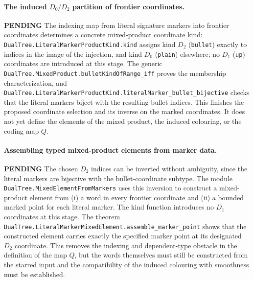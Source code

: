 \documentclass[11pt]{article}
\newcommand{\todo}{\textcolor{gray!70!black}{\textbf{PENDING}}}
\newcommand{\lean}[1]{\texttt{#1}}
\begin{document}
\paragraph{The induced $D_0/D_2$ partition of frontier coordinates.} \todo
The indexing map from literal signature markers into frontier coordinates
determines a concrete mixed-product coordinate kind:
\lean{DualTree.LiteralMarkerProductKind.kind} assigns kind $D_2$
(\texttt{bullet}) exactly to indices in the image of the injection,
and kind $D_0$ (\texttt{plain}) elsewhere; no $D_1$
(\texttt{up}) coordinates are introduced at this stage.
The generic
\lean{DualTree.MixedProduct.bulletKindOfRange_iff} proves the
membership characterization, and
\lean{DualTree.LiteralMarkerProductKind.literalMarker_bullet_bijective}
checks that the literal markers biject with the resulting bullet indices.
This finishes the proposed coordinate selection and its inverse
on the marked coordinates. It does not yet define the elements of the
mixed product, the induced colouring, or the coding map $Q$.

\paragraph{Assembling typed mixed-product elements from marker data.} \todo
The chosen $D_2$ indices can be inverted without ambiguity, since
the literal markers are bijective with the bullet-coordinate subtype.
The module \lean{DualTree.MixedElementFromMarkers} uses this inversion
to construct a mixed-product element from (i) a word in every frontier
coordinate and (ii) a bounded marked point for each literal marker.
The kind function introduces no $D_1$ coordinates at this stage.
The theorem
\lean{DualTree.LiteralMarkerMixedElement.assemble_marker_point}
shows that the constructed element carries exactly the specified
marker point at its designated $D_2$ coordinate.
This removes the indexing and dependent-type obstacle in the
definition of the map $Q$, but the words themselves must still be
constructed from the starred input and the compatibility of the
induced colouring with smoothness must be established.
\end{document}
